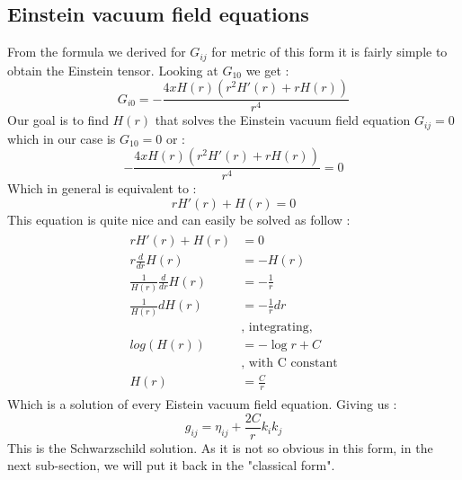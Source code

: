 \documentclass[a4paper,12pt]{article}
\theoremstyle{definition}
\begin{document}
\subsection{Einstein vacuum field equations}
From the formula we derived for $G_{ij}$ for metric of this form it is fairly simple to obtain the Einstein tensor.
Looking at $G_{10}$ we get :
\begin{equation}
	G_{i0}=-\frac{4x H(r) (r^2 H'(r)+rH(r))}{r^4}
\end{equation}
Our goal is to find $H(r)$ that solves the Einstein vacuum field equation $G_{ij}=0$ which in our case is $G_{10}=0$ or :
\begin{equation}
	-\frac{4x H(r) (r^2 H'(r)+rH(r))}{r^4}=0
\end{equation}
Which in general is equivalent to :
\begin{equation}
	rH'(r)+H(r)=0
\end{equation}
This equation is quite nice and can easily be solved as follow :
\begin{align}
\begin{split}
	rH'(r)+H(r)&=0\\
	r\frac{d}{dr}H(r)&=-H(r)\\
	\frac{1}{H(r)}\frac{d}{dr}H(r)&=-\frac{1}{r}\\
	\frac{1}{H(r)}dH(r)&=-\frac{1}{r}dr \;\\
	&\text{, integrating,}\\
	log(H(r))&=-\log{r}+C \;\\
	&\text{, with C constant}\\
	H(r)&=\frac{C}{r}
\end{split}
\end{align}
Which is a solution of every Eistein vacuum field equation. Giving us :
\begin{equation}
	g_{ij}=\eta_{ij}+\frac{2C}{r}k_ik_j
\end{equation}
This is the Schwarzschild solution.
As it is not so obvious in this form, in the next sub-section, we will put it back in the "classical form".
\end{document}
